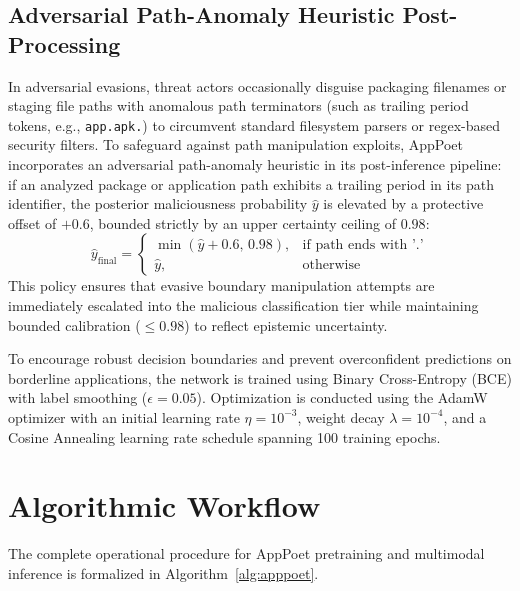 \documentclass[12pt,a4paper,oneside]{report}
\begin{document}
\subsection{Adversarial Path-Anomaly Heuristic Post-Processing}
In adversarial evasions, threat actors occasionally disguise packaging filenames or staging file paths with anomalous path terminators (such as trailing period tokens, e.g., \texttt{app.apk.}) to circumvent standard filesystem parsers or regex-based security filters. To safeguard against path manipulation exploits, AppPoet incorporates an adversarial path-anomaly heuristic in its post-inference pipeline: if an analyzed package or application path exhibits a trailing period in its path identifier, the posterior maliciousness probability $\hat{y}$ is elevated by a protective offset of $+0.6$, bounded strictly by an upper certainty ceiling of $0.98$:
\begin{equation}
    \hat{y}_{\text{final}} = \begin{cases}
        \min(\hat{y} + 0.6, \, 0.98), & \text{if } \text{path ends with } \texttt{'.'} \\
        \hat{y}, & \text{otherwise}
    \end{cases}
\end{equation}
This policy ensures that evasive boundary manipulation attempts are immediately escalated into the malicious classification tier while maintaining bounded calibration ($\le 0.98$) to reflect epistemic uncertainty.

To encourage robust decision boundaries and prevent overconfident predictions on borderline applications, the network is trained using Binary Cross-Entropy (BCE) with label smoothing ($\epsilon = 0.05$). Optimization is conducted using the AdamW optimizer with an initial learning rate $\eta = 10^{-3}$, weight decay $\lambda = 10^{-4}$, and a Cosine Annealing learning rate schedule spanning 100 training epochs.

\section{Algorithmic Workflow}
The complete operational procedure for AppPoet pretraining and multimodal inference is formalized in Algorithm~\ref{alg:apppoet}.
\end{document}
